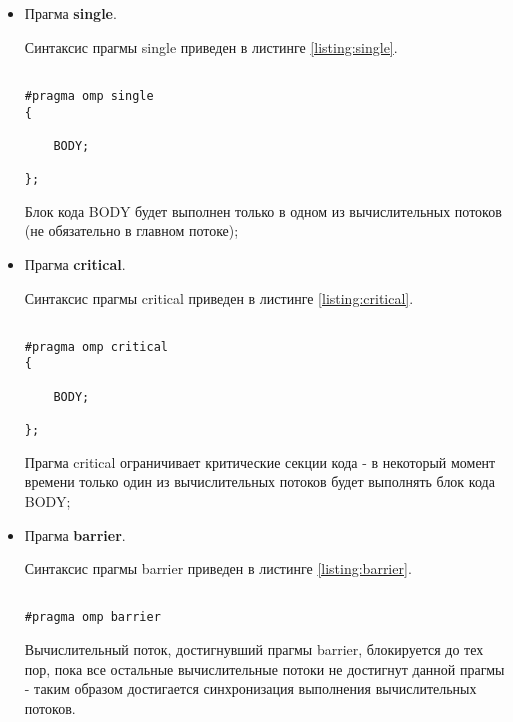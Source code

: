 \begin{itemize}

	\item Прагма {\bf single}.

	Синтаксис прагмы single приведен в листинге \ref{listing:single}.

\begin{lstlisting}

#pragma omp single
{

	BODY;

};

\end{lstlisting}
\mylistingend

	Блок кода BODY будет выполнен только в одном из вычислительных потоков (не обязательно в главном потоке);

	\item Прагма {\bf critical}.

	Синтаксис прагмы critical приведен в листинге \ref{listing:critical}.

\begin{lstlisting}

#pragma omp critical
{

	BODY;

};

\end{lstlisting}
\mylistingend

	Прагма critical ограничивает критические секции кода - в некоторый момент времени только один из вычислительных потоков будет выполнять блок кода BODY;

	\item Прагма {\bf barrier}.

	Синтаксис прагмы barrier приведен в листинге \ref{listing:barrier}.

\begin{lstlisting}

#pragma omp barrier

\end{lstlisting}
\mylistingend

	Вычислительный поток, достигнувший прагмы barrier, блокируется до тех пор, пока все остальные вычислительные потоки не достигнут данной прагмы - таким образом достигается синхронизация выполнения вычислительных потоков.

\end{itemize}


